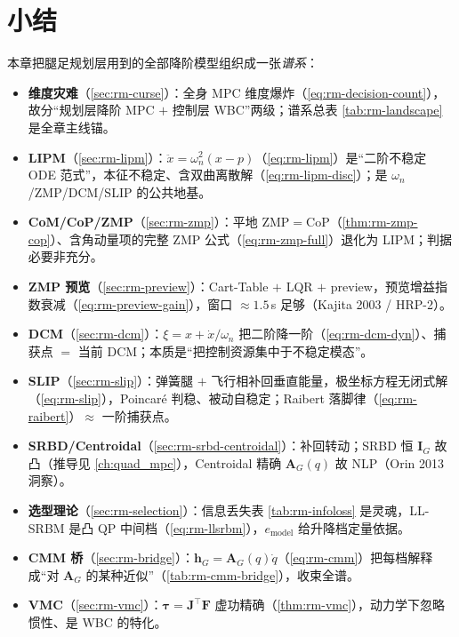 \section*{小结}
本章把腿足规划层用到的全部降阶模型组织成一张\emph{谱系}：
\begin{itemize}
  \item \textbf{维度灾难}（\cref{sec:rm-curse}）：全身 MPC 维度爆炸（\cref{eq:rm-decision-count}），故分“规划层降阶 MPC $+$ 控制层 WBC”两级；谱系总表 \cref{tab:rm-landscape} 是全章主线锚。
  \item \textbf{LIPM}（\cref{sec:rm-lipm}）：$\ddot{x}=\omega_n^2(x-p)$（\cref{eq:rm-lipm}）是“二阶不稳定 ODE 范式”，本征不稳定、含双曲离散解（\cref{eq:rm-lipm-disc}）；是 $\omega_n$/ZMP/DCM/SLIP 的公共地基。
  \item \textbf{CoM/CoP/ZMP}（\cref{sec:rm-zmp}）：平地 ZMP$=$CoP（\cref{thm:rm-zmp-cop}）、含角动量项的完整 ZMP 公式（\cref{eq:rm-zmp-full}）退化为 LIPM；判据必要非充分。
  \item \textbf{ZMP 预览}（\cref{sec:rm-preview}）：Cart-Table $+$ LQR $+$ preview，预览增益指数衰减（\cref{eq:rm-preview-gain}），窗口 $\approx1.5$\,s 足够（Kajita 2003 / HRP-2）。
  \item \textbf{DCM}（\cref{sec:rm-dcm}）：$\xi=x+\dot{x}/\omega_n$ 把二阶降一阶（\cref{eq:rm-dcm-dyn}）、捕获点 $=$ 当前 DCM；本质是“把控制资源集中于不稳定模态”。
  \item \textbf{SLIP}（\cref{sec:rm-slip}）：弹簧腿 $+$ 飞行相补回垂直能量，极坐标方程无闭式解（\cref{eq:rm-slip}），Poincaré 判稳、被动自稳定；Raibert 落脚律（\cref{eq:rm-raibert}）$\approx$ 一阶捕获点。
  \item \textbf{SRBD/Centroidal}（\cref{sec:rm-srbd-centroidal}）：补回转动；SRBD 恒 $\mathbf{I}_G$ 故凸（推导见 \cref{ch:quad_mpc}），Centroidal 精确 $\mathbf{A}_G(q)$ 故 NLP（Orin 2013 洞察）。
  \item \textbf{选型理论}（\cref{sec:rm-selection}）：信息丢失表 \cref{tab:rm-infoloss} 是灵魂，LL-SRBM 是凸 QP 中间档（\cref{eq:rm-llsrbm}），$e_{\mathrm{model}}$ 给升降档定量依据。
  \item \textbf{CMM 桥}（\cref{sec:rm-bridge}）：$\mathbf{h}_G=\mathbf{A}_G(q)\dot{q}$（\cref{eq:rm-cmm}）把每档解释成“对 $\mathbf{A}_G$ 的某种近似”（\cref{tab:rm-cmm-bridge}），收束全谱。
  \item \textbf{VMC}（\cref{sec:rm-vmc}）：$\boldsymbol{\tau}=\mathbf{J}^\top\mathbf{F}$ 虚功精确（\cref{thm:rm-vmc}），动力学下忽略惯性、是 WBC 的特化。
\end{itemize}

